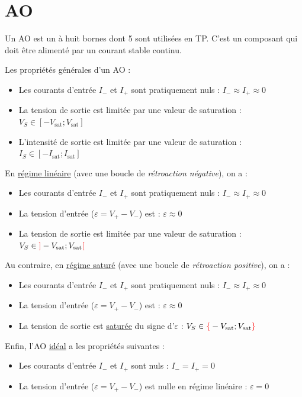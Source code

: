 \documentclass[11pt,a4paper,fleqn,pdftex]{report}
\begin{document}
\section{\acrfull{AO}} %
\label{sec:AO}
\begin{dfn}[L'\acrlong{AO}]
   Un \gls{AO} est un  à huit bornes dont 5 sont utilisées en TP. C'est un composant  qui doit être alimenté par un courant stable continu.
\end{dfn}
\begin{prop}
Les propriétés générales d'un \gls{AO} :
   \begin{itemize}
     \item Les courants d'entrée $I_-$ et $I_+$ sont pratiquement nuls : $I_- \approx I_+ \approx 0$
     \item La tension de sortie est limitée par une valeur de saturation : $V_S \in [-V_\text{sat} ; V_\text{sat}] $
     \item L'intensité de sortie est limitée par une valeur de saturation : $I_S \in [-I_\text{sat} ; I_\text{sat}] $
   \end{itemize}
   \vspace{6mm}
En \uline{régime linéaire} (avec une boucle de \emph{rétroaction négative}), on a : 
   \begin{itemize}
     \item Les courants d'entrée $I_-$ et $I_+$ sont pratiquement nuls : $I_- \approx I_+ \approx 0$
     \item La tension d'entrée ($\varepsilon = V_+ - V_-$) est  : $\varepsilon \approx 0$
     \item La tension de sortie est limitée par une valeur de saturation : $V_S \in \textcolor{couleurImp}{]}-V_\text{sat} ; V_\text{sat}\textcolor{couleurImp}{[} $
   \end{itemize}
   \vspace{6mm}
Au contraire, en \uline{régime saturé} (avec une boucle de \emph{rétroaction positive}), on a : 
   \begin{itemize}
     \item Les courants d'entrée $I_-$ et $I_+$ sont pratiquement nuls : $I_- \approx I_+ \approx 0$
     \item La tension d'entrée ($\varepsilon = V_+ - V_-$) est  : $\varepsilon \approx 0$
     \item La tension de sortie est \uline{saturée} du signe d'$\varepsilon$ : $V_S \in \textcolor{couleurImp}{\lbrace}-V_\text{sat} ; V_\text{sat}\textcolor{couleurImp}{\rbrace} $
   \end{itemize}
   \vspace{6mm}
Enfin, l'\gls{AO} \uline{idéal} a les propriétés suivantes : 
   \begin{itemize}
     \item Les courants d'entrée $I_-$ et $I_+$ sont nuls : $I_- = I_+ = 0$
     \item La tension d'entrée ($\varepsilon = V_+ - V_-$) est nulle en régime linéaire : $\varepsilon = 0$
   \end{itemize}
\end{prop}
\needspace{10cm}
\end{document}
